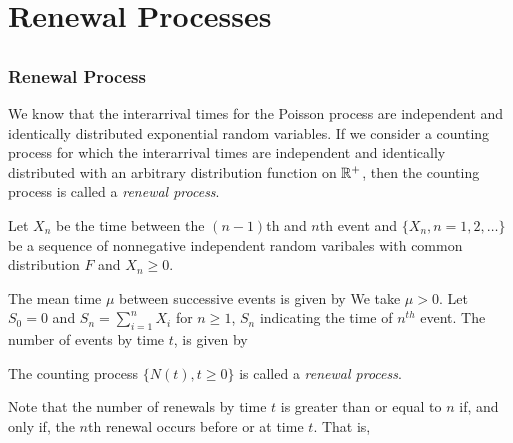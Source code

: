\documentclass[all-lectures.tex]{subfiles}
\author{}
\begin{document}
\setcounter{chapter}{1}
\chapter{Renewal Processes}

\setcounter{section}{1}
\section*{}
\subsection{Renewal Process}
We know that the interarrival times for the Poisson process are independent and identically distributed exponential random variables.
If we consider a counting process for which the interarrival times are independent and identically distributed with an arbitrary distribution function on $\mathbb{R}^+$, then the counting process is called a \textit{renewal process}.

Let $X_n$ be the time between the $(n-1)$th and $n$th event and $\{X_n,n=1,2,\dots\}$ be a sequence of nonnegative independent random varibales with common distribution $F$ and $X_n \ge 0$.

The mean time $\mu$ between successive events is given by
We take $\mu > 0$. Let $S_0=0$ and $S_n = \sum_{i=1}^{n} X_i$ for $n \ge 1$, $S_n$ indicating the time of $n^{th}$ event.
The number of events by time $t$, is given by

\begin{defn}
The counting process $\{ N(t),t \ge 0\}$ is called a \textit{renewal process}.
\end{defn}

Note that the number of renewals by time $t$ is greater than or equal to $n$ if, and only if, the $n$th renewal occurs before or at time $t$.
That is,
\end{document}
